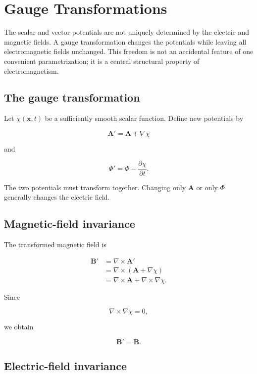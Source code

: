 \section{Gauge Transformations}
\label{sec:gauge_transformations}

The scalar and vector potentials are not uniquely determined by the electric and magnetic fields. A gauge transformation changes the potentials while leaving all electromagnetic fields unchanged. This freedom is not an accidental feature of one convenient parametrization; it is a central structural property of electromagnetism.

\subsection{The gauge transformation}

Let \(\chi(\mathbf{x},t)\) be a sufficiently smooth scalar function. Define new potentials by

\[
\boxed{
\mathbf{A}'
=
\mathbf{A}
+
\nabla\chi
}
\]

and

\[
\boxed{
\Phi'
=
\Phi
-
\frac{\partial\chi}{\partial t}
}.
\]

The two potentials must transform together. Changing only \(\mathbf{A}\) or only \(\Phi\) generally changes the electric field.

\subsection{Magnetic-field invariance}

The transformed magnetic field is

\[
\begin{aligned}
\mathbf{B}'
&=
\nabla\times\mathbf{A}'\\
&=
\nabla\times
\left(
\mathbf{A}+
\nabla\chi
\right)\\
&=
\nabla\times\mathbf{A}
+
\nabla\times\nabla\chi.
\end{aligned}
\]

Since

\[
\nabla\times\nabla\chi=0,
\]

we obtain

\[
\boxed{
\mathbf{B}'=\mathbf{B}
}.
\]

\subsection{Electric-field invariance}

